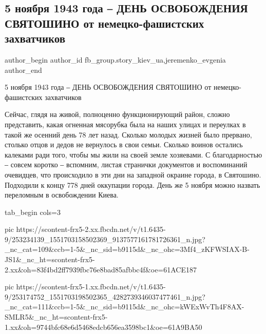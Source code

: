  
 
 
 
 
 
\subsection{5 ноября 1943 года ‒ ДЕНЬ ОСВОБОЖДЕНИЯ СВЯТОШИНО от немецко-фашистских захватчиков}
\label{sec:05_11_2021.fb.fb_group.story_kiev_ua.5.svjatoshino_1943_osvobozhdenie}
 
\ifcmt
 author_begin
   author_id fb_group.story_kiev_ua,jeremenko_evgenia
 author_end
\fi

5 ноября 1943 года ‒ ДЕНЬ ОСВОБОЖДЕНИЯ СВЯТОШИНО от немецко-фашистских
захватчиков

Сейчас, глядя на живой, полноценно функционирующий район, сложно представить,
какая огненная мясорубка была на наших улицах и переулках в такой же осенний
день 78 лет назад. Сколько молодых жизней было прервано, столько отцов и дедов
не вернулось в свои семьи. Сколько воинов остались калеками ради того, чтобы мы
жили на своей земле хозяевами. С благодарностью ‒ совсем коротко ‒ вспомним,
листая странички документов и воспоминаний очевидцев, что происходило в эти дни
на западной окраине города, в Святошино. Подходили к концу 778 дней оккупации
города. День же 5 ноября можно назвать переломным в освобождении Киева. 

\ifcmt
  tab_begin cols=3

     pic https://scontent-frx5-2.xx.fbcdn.net/v/t1.6435-9/253234139_1551703158502369_9137577161781726361_n.jpg?_nc_cat=109&ccb=1-5&_nc_sid=b9115d&_nc_ohc=3Mf4_zKFWSIAX-B-JS1&_nc_ht=scontent-frx5-2.xx&oh=83f4bd2ff7939fbc76e8bad85afbbc4f&oe=61ACE187

     pic https://scontent-frx5-1.xx.fbcdn.net/v/t1.6435-9/253174752_1551703198502365_4282739346037477461_n.jpg?_nc_cat=111&ccb=1-5&_nc_sid=b9115d&_nc_ohc=kWExWvTh4F8AX-SMLR5&_nc_ht=scontent-frx5-1.xx&oh=9744bfc68e6d5468edcb656ea3598bc1&oe=61A9BA50

